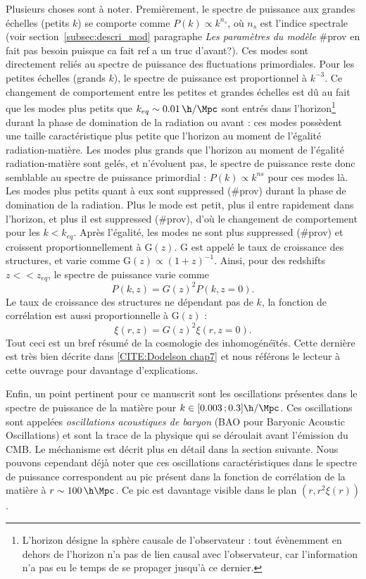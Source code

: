 \documentclass[11pt, twoside, a4paper, openright]{report}
\begin{document}
Plusieurs choses sont à noter. Premièrement, le spectre de puissance aux grandes échelles (petits $k$) se comporte comme $P(k) \propto k^{n_s}$, où $n_s$ est l'indice spectrale (voir section~\ref{subsec:descri_mod} paragraphe \emph{Les paramètres du modèle} \#prov en fait pas besoin puisque ca fait ref a un truc d'avant?). Ces modes sont directement reliés au spectre de puissance des fluctuations primordiales. Pour les petites échelles (grands $k$), le spectre de puissance est proportionnel à $k^{-3}$. Ce changement de comportement entre les petites et grandes échelles est dû au fait que les modes plus petits que $k_{eq} \sim \SI{0.01}{\h\per\Mpc}$ sont entrés dans l'horizon\footnote{L'horizon désigne la sphère causale de l'observateur : tout évènemment en dehors de l'horizon n'a pas de lien causal avec l'observateur, car l'information n'a pas eu le temps de se propager jusqu'à ce dernier.} durant la phase de domination de la radiation ou avant : ces modes possèdent une taille caractéristique plus petite que l'horizon au moment de l'égalité radiation-matière. Les modes plus grands que l'horizon au moment de l'égalité radiation-matière sont gelés, et n'évoluent pas, le spectre de puissance reste donc semblable au spectre de puissance primordial : $P(k) \propto k^{ns}$ pour ces modes là. Les modes plus petits quant à eux sont suppressed (\#prov) durant la phase de domination de la radiation. Plus le mode est petit, plus il entre rapidement dans l'horizon, et plus il est suppressed (\#prov), d'où le changement de comportement pour les $k < k_{eq}$. Après l'égalité, les modes ne sont plus suppressed (\#prov) et croissent proportionnellement à $\mathrm{G}(z)$. $\mathrm{G}$ est appelé le taux de croissance des structures, et varie comme $\mathrm{G}(z) \propto (1+z)^{-1}$. Ainsi, pour des redshifts $z << z_{eq}$, le spectre de puissance varie comme
\begin{equation}
  \label{eq:pow_spec_vs_z}
  P(k,z) = G(z)^{2} P(k,z=0) .
\end{equation}
Le taux de croissance des structures ne dépendant pas de $k$, la fonction de corrélation est aussi proportionnelle à $\mathrm{G}(z)$ :
\begin{equation}
  \label{eq:cf_vs_z}
  \xi(r, z) = G(z)^{2} \xi(r, z=0).
\end{equation}
Tout ceci est un bref résumé de la cosmologie des inhomogénéïtés. Cette dernière est très bien décrite dans \ref{CITE:Dodelson chap7} et nous référons le lecteur à cette ouvrage pour davantage d'explications.


Enfin, un point pertinent pour ce manuscrit sont les oscillations présentes dans le spectre de puissance de la matière pour $k \in [\num{0.003} \,; \num{0.3}] \si{\h\per\Mpc}$. Ces oscillations sont appelées \emph{oscillations acoustiques de baryon} (BAO pour Baryonic Acoustic Oscillations) et sont la trace de la physique qui se déroulait avant l'émission du CMB. Le méchanisme est décrit plus en détail dans la section suivante. Nous pouvons cependant déjà noter que ces oscillations caractéristiques dans le spectre de puissance correspondent au pic présent dans la fonction de corrélation de la matière à $r \sim \SI{100}{\per\h\Mpc}$. Ce pic est davantage visible dans le plan $(r, r^{2} \xi(r))$.
\end{document}
